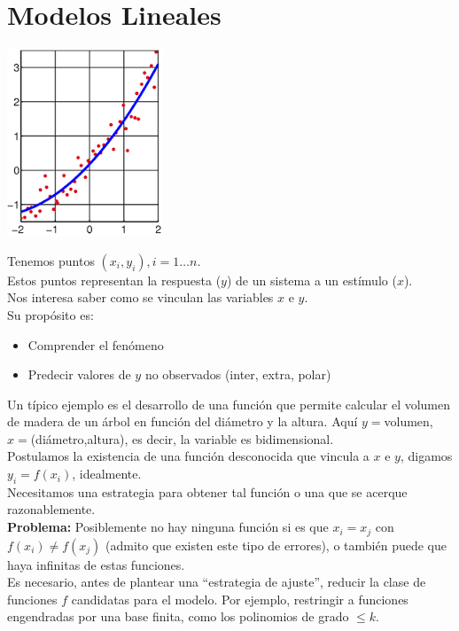 \documentclass[10pt]{article}
\theoremstyle{plain}
\theoremstyle{definition}
\begin{document}
\section{Modelos Lineales}
\begin{center}
\includegraphics[scale=0.5]{imagenes/minimosCuadrados.png}
\end{center}
Tenemos puntos $(x_{i}, y_{i}), i = 1\ldots n$.\\
Estos puntos representan la respuesta ($y$) de un sistema a un estímulo ($x$).\\
Nos interesa saber como se vinculan las variables $x$ e $y$.\\
Su propósito es:
\begin{itemize}
\item Comprender el fenómeno
\item Predecir valores de $y$ no observados (inter, extra, polar)
\end{itemize}
Un típico ejemplo es el desarrollo de una función que permite calcular el volumen de madera de un árbol en función del diámetro y la altura. Aquí $y=$volumen, $x=$(diámetro,altura), es decir, la variable es bidimensional.\\

Postulamos la existencia de una función desconocida que vincula a $x$ e $y$, digamos $y_{i}=f(x_{i})$, idealmente.\\

Necesitamos una estrategia para obtener tal función o una que se acerque razonablemente.\\

\textbf{Problema:} Posiblemente no hay ninguna función si es que $x_{i}=x_{j}$ con $f(x_{i})\not = f(x_{j})$ (admito que existen este tipo de errores), o también puede que haya infinitas de estas funciones.\\

Es necesario, antes de plantear una ``estrategia de ajuste'', reducir la clase de funciones $f$ candidatas para el modelo. Por ejemplo, restringir a funciones engendradas por una base finita, como los polinomios de grado $\le k$.\\
\end{document}
